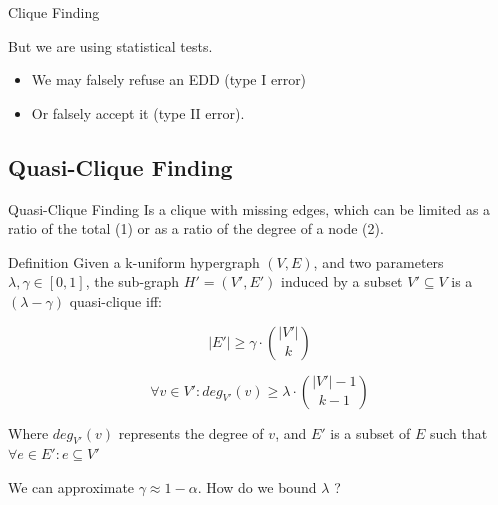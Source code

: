 \documentclass[10pt]{beamer}
\begin{document}
\begin{frame}{Clique Finding}
    \pause
    
    \begin{alertblock}{}
    But we are using statistical tests.
    
    \begin{itemize}
        \item We may falsely refuse an EDD (type I error)
        \item Or falsely accept it (type II error).
    \end{itemize}
    \end{alertblock}
\end{frame}


\subsection{Quasi-Clique Finding}
\begin{frame}{Quasi-Clique Finding}
    Is a clique with missing edges, which can be limited as a ratio of the total (1)
    or as a ratio of the degree of a node (2).

    \begin{alertblock}{Definition}
    Given a k-uniform hypergraph $(V,E)$, and two parameters $\lambda, \gamma \in [0,1]$,
    the sub-graph $H'=(V',E')$ induced by a subset $V' \subseteq V$ is a
    $(\lambda-\gamma)$ quasi-clique iff:
    
    \begin{equation}
        |E'| \ge \gamma \cdot \binom{|V'|}{k}
        \label{eq:edge_hyperclique}
    \end{equation}
    
    \begin{equation}
        \forall v \in V': deg_{V'}(v) \ge \lambda \cdot \binom{|V'| - 1}{k - 1}
        \label{eq:deg_hyperclique}
    \end{equation}

    Where $deg_{V'}(v)$ represents the degree of $v$, and $E'$ is a subset of $E$ such that
    $\forall e \in E' : e \subseteq V'$
    \end{alertblock}
    
    We can approximate $\gamma \approx 1 - \alpha$. How do we bound $\lambda$ ?
\end{frame}
\end{document}
